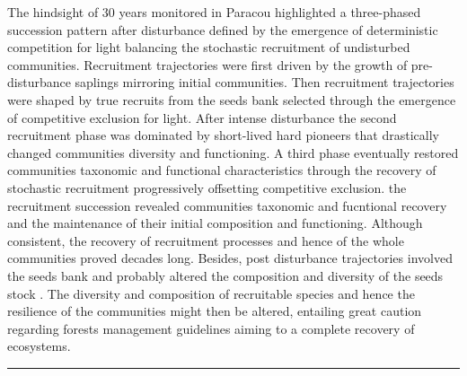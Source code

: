 \documentclass[fleqn,10pt]{ArtEcoFoG} %
\begin{document}
The hindsight of 30 years monitored in Paracou highlighted a
three-phased succession pattern after disturbance defined by the
emergence of deterministic competition for light balancing the
stochastic recruitment of undisturbed communities. Recruitment
trajectories were first driven by the growth of pre-disturbance saplings
mirroring initial communities. Then recruitment trajectories were shaped
by true recruits from the seeds bank selected through the emergence of
competitive exclusion for light. After intense disturbance the second
recruitment phase was dominated by short-lived hard pioneers that
drastically changed communities diversity and functioning. A third phase
eventually restored communities taxonomic and functional characteristics
through the recovery of stochastic recruitment progressively offsetting
competitive exclusion. the recruitment succession revealed communities
taxonomic and fucntional recovery and the maintenance of their initial
composition and functioning. Although consistent, the recovery of
recruitment processes and hence of the whole communities proved decades
long. Besides, post disturbance trajectories involved the seeds bank and
probably altered the composition and diversity of the seeds stock
\citep{Norden2009}. The diversity and composition of recruitable species
and hence the resilience of the communities might then be altered,
entailing great caution regarding forests management guidelines aiming
to a complete recovery of ecosystems.

\begin{center}\rule{0.5\linewidth}{\linethickness}\end{center}



\makeatletter

\makeatother


\end{document}
